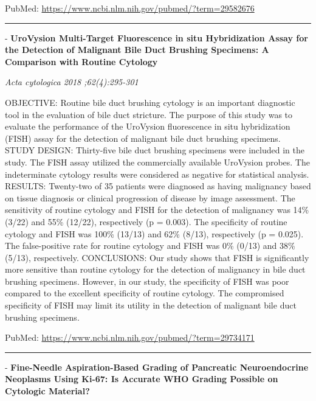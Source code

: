 \documentclass[]{article}
\begin{document}
PubMed: \url{https://www.ncbi.nlm.nih.gov/pubmed/?term=29582676}

{}

{}

\begin{center}\rule{0.5\linewidth}{\linethickness}\end{center}

 - \textbf{UroVysion Multi-Target Fluorescence in situ Hybridization
Assay for the Detection of Malignant Bile Duct Brushing Specimens: A
Comparison with Routine Cytology}

\emph{Acta cytologica 2018 ;62(4):295-301}

OBJECTIVE: Routine bile duct brushing cytology is an important
diagnostic tool in the evaluation of bile duct stricture. The purpose of
this study was to evaluate the performance of the UroVysion fluorescence
in situ hybridization (FISH) assay for the detection of malignant bile
duct brushing specimens. STUDY DESIGN: Thirty-five bile duct brushing
specimens were included in the study. The FISH assay utilized the
commercially available UroVysion probes. The indeterminate cytology
results were considered as negative for statistical analysis. RESULTS:
Twenty-two of 35 patients were diagnosed as having malignancy based on
tissue diagnosis or clinical progression of disease by image assessment.
The sensitivity of routine cytology and FISH for the detection of
malignancy was 14\% (3/22) and 55\% (12/22), respectively (p = 0.003).
The specificity of routine cytology and FISH was 100\% (13/13) and 62\%
(8/13), respectively (p = 0.025). The false-positive rate for routine
cytology and FISH was 0\% (0/13) and 38\% (5/13), respectively.
CONCLUSIONS: Our study shows that FISH is significantly more sensitive
than routine cytology for the detection of malignancy in bile duct
brushing specimens. However, in our study, the specificity of FISH was
poor compared to the excellent specificity of routine cytology. The
compromised specificity of FISH may limit its utility in the detection
of malignant bile duct brushing specimens.

PubMed: \url{https://www.ncbi.nlm.nih.gov/pubmed/?term=29734171}

{}

{}

\begin{center}\rule{0.5\linewidth}{\linethickness}\end{center}

 - \textbf{Fine-Needle Aspiration-Based Grading of Pancreatic
Neuroendocrine Neoplasms Using Ki-67: Is Accurate WHO Grading Possible
on Cytologic Material?}
\end{document}
